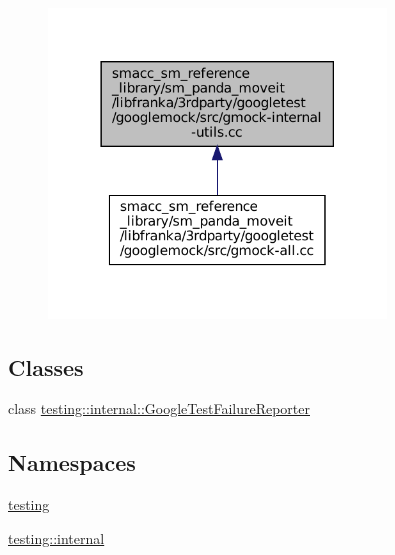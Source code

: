\begin{figure}[H]
\begin{center}
\leavevmode
\includegraphics[width=254pt]{gmock-internal-utils_8cc__dep__incl}
\end{center}
\end{figure}
\subsection*{Classes}
\begin{DoxyCompactItemize}
\item 
class \hyperlink{classtesting_1_1internal_1_1GoogleTestFailureReporter}{testing\+::internal\+::\+Google\+Test\+Failure\+Reporter}
\end{DoxyCompactItemize}
\subsection*{Namespaces}
\begin{DoxyCompactItemize}
\item 
 \hyperlink{namespacetesting}{testing}
\item 
 \hyperlink{namespacetesting_1_1internal}{testing\+::internal}
\end{DoxyCompactItemize}

